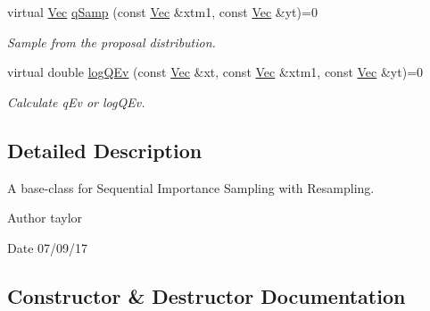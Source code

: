 \begin{DoxyCompactItemize}
virtual \hyperlink{pmfs_8h_a4c7df05c6f5e8a0d15ae14bcdbc07152}{Vec} \hyperlink{classSISRFilter_a2c480a10cac8b52a36ab1309cf9ea1a4}{q\+Samp} (const \hyperlink{pmfs_8h_a4c7df05c6f5e8a0d15ae14bcdbc07152}{Vec} \&xtm1, const \hyperlink{pmfs_8h_a4c7df05c6f5e8a0d15ae14bcdbc07152}{Vec} \&yt)=0
\begin{DoxyCompactList}\small\item\em Sample from the proposal distribution. \end{DoxyCompactList}\item 
virtual double \hyperlink{classSISRFilter_af289db59b008a0ab795fc3b8e9887043}{log\+Q\+Ev} (const \hyperlink{pmfs_8h_a4c7df05c6f5e8a0d15ae14bcdbc07152}{Vec} \&xt, const \hyperlink{pmfs_8h_a4c7df05c6f5e8a0d15ae14bcdbc07152}{Vec} \&xtm1, const \hyperlink{pmfs_8h_a4c7df05c6f5e8a0d15ae14bcdbc07152}{Vec} \&yt)=0
\begin{DoxyCompactList}\small\item\em Calculate q\+Ev or log\+Q\+Ev. \end{DoxyCompactList}\end{DoxyCompactItemize}


\subsection{Detailed Description}
A base-\/class for Sequential Importance Sampling with Resampling. 

\begin{DoxyAuthor}{Author}
taylor 
\end{DoxyAuthor}
\begin{DoxyDate}{Date}
07/09/17 
\end{DoxyDate}


\subsection{Constructor \& Destructor Documentation}
